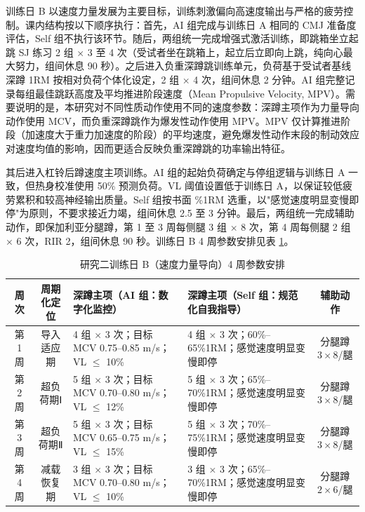 \documentclass[UTF8,zihao=-4,twoside,openany]{ctexbook}
\begin{document}
训练日 B 以速度力量发展为主要目标，训练刺激偏向高速度输出与严格的疲劳控制。课内结构按以下顺序执行：首先，AI 组完成与训练日 A 相同的 CMJ 准备度评估，Self 组不执行该环节。随后，两组统一完成增强式激活训练，即跳箱坐立起跳 SJ 练习 2 组 $\times$ 3 至 4 次（受试者坐在跳箱上，起立后立即向上跳，纯向心最大努力，组间休息 90 秒）。之后进入负重深蹲跳训练单元，负荷基于受试者基线深蹲 1RM 按相对负荷个体化设定，2 组 $\times$ 4 次，组间休息 2 分钟。AI 组完整记录每组最佳跳跃高度及平均推进阶段速度（Mean Propulsive Velocity, MPV）。需要说明的是，本研究对不同性质动作使用不同的速度参数：深蹲主项作为力量导向动作使用 MCV，而负重深蹲跳作为爆发性动作使用 MPV。MPV 仅计算推进阶段（加速度大于重力加速度的阶段）的平均速度，避免爆发性动作末段的制动效应对速度均值的影响，因而更适合反映负重深蹲跳的功率输出特征。

其后进入杠铃后蹲速度主项训练。AI 组的起始负荷确定与停组逻辑与训练日 A 一致，但热身校准使用 50\% 预测负荷。VL 阈值设置低于训练日 A，以保证较低疲劳累积和较高神经输出质量。Self 组按书面 \%1RM 选重，以"感觉速度明显变慢即停"为原则，不要求接近力竭，组间休息 2.5 至 3 分钟。最后，两组统一完成辅助动作，即保加利亚分腿蹲，第 1 至 3 周每侧腿 3 组 $\times$ 8 次，第 4 周每侧腿 2 组 $\times$ 6 次，RIR 2，组间休息 90 秒。训练日 B 4 周参数安排见表 \ref{tab:ch3-trainB}。

\begin{table}[htbp]
  \centering
  \caption{研究二训练日 B（速度力量导向）4 周参数安排}
  \label{tab:ch3-trainB}
  \vspace{6pt}
  \small
  \begin{tabularx}{\textwidth}{|c|c|X|X|c|}
    \hline
    \textbf{周次} & \textbf{周期化定位} & \textbf{深蹲主项（AI 组：数字化监控）} & \textbf{深蹲主项（Self 组：规范化自我指导）} & \textbf{辅助动作} \\ \hline
    第 1 周 & 导入适应期 & 4 组 $\times$ 3 次；目标 MCV 0.75--0.85 m/s；VL $\le$ 10\% & 4 组 $\times$ 3 次；60\%--65\%1RM；感觉速度明显变慢即停 & 分腿蹲 $3\times 8$/腿 \\ \hline
    第 2 周 & 超负荷期Ⅰ & 5 组 $\times$ 3 次；目标 MCV 0.70--0.80 m/s；VL $\le$ 12\% & 5 组 $\times$ 3 次；65\%--70\%1RM；感觉速度明显变慢即停 & 分腿蹲 $3\times 8$/腿 \\ \hline
    第 3 周 & 超负荷期Ⅱ & 5 组 $\times$ 3 次；目标 MCV 0.65--0.75 m/s；VL $\le$ 15\% & 5 组 $\times$ 3 次；70\%--75\%1RM；感觉速度明显变慢即停 & 分腿蹲 $3\times 8$/腿 \\ \hline
    第 4 周 & 减载恢复期 & 3 组 $\times$ 3 次；目标 MCV 0.70--0.80 m/s；VL $\le$ 10\% & 3 组 $\times$ 3 次；65\%--70\%1RM；感觉速度明显变慢即停 & 分腿蹲 $2\times 6$/腿 \\ \hline
  \end{tabularx}
\end{table}
\end{document}
